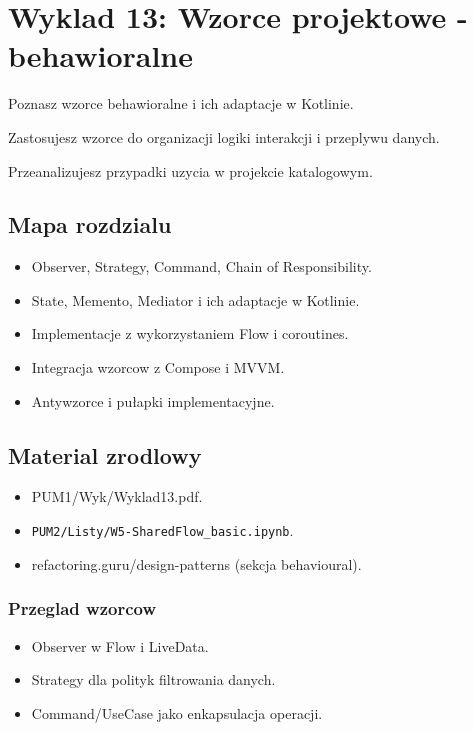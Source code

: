 \chapter{Wyklad 13: Wzorce projektowe - behawioralne}

\begin{learningobjectives}
  \item Poznasz wzorce behawioralne i ich adaptacje w Kotlinie.
  \item Zastosujesz wzorce do organizacji logiki interakcji i przeplywu danych.
  \item Przeanalizujesz przypadki uzycia w projekcie katalogowym.
\end{learningobjectives}

\section{Mapa rozdzialu}
\begin{itemize}
  \item Observer, Strategy, Command, Chain of Responsibility.
  \item State, Memento, Mediator i ich adaptacje w Kotlinie.
  \item Implementacje z wykorzystaniem Flow i coroutines.
  \item Integracja wzorcow z Compose i MVVM.
  \item Antywzorce i pułapki implementacyjne.
\end{itemize}

\section{Material zrodlowy}
\begin{itemize}
  \item PUM1/Wyk/Wyklad13.pdf.
  \item \texttt{PUM2/Listy/W5-SharedFlow\_basic.ipynb}.
  \item refactoring.guru/design-patterns (sekcja behavioural).
\end{itemize}

\subsection{Przeglad wzorcow}
\begin{itemize}
  \item Observer w Flow i LiveData.
  \item Strategy dla polityk filtrowania danych.
  \item Command/UseCase jako enkapsulacja operacji.
\end{itemize}

